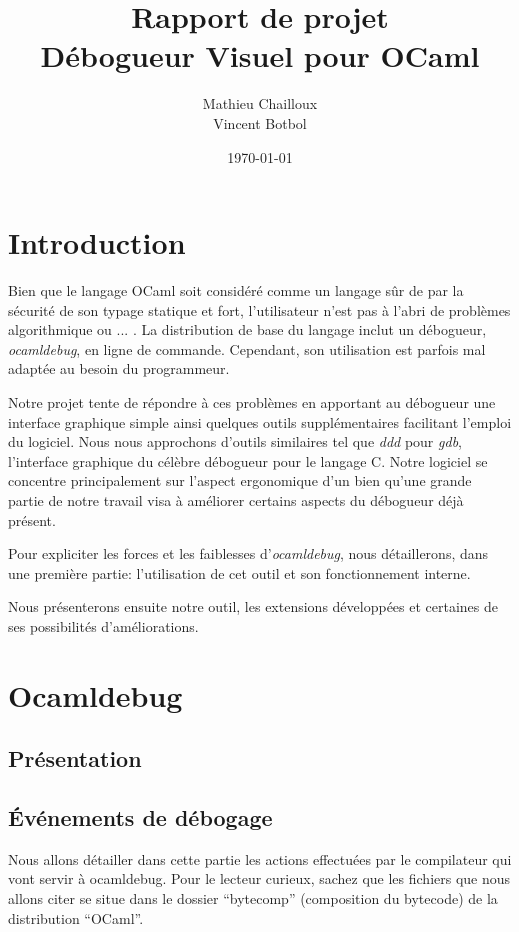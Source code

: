 \documentclass[11pt,a4paper]{report}
\title{Rapport de projet\\Débogueur Visuel pour OCaml}
\author{Mathieu Chailloux\\Vincent Botbol}
\date\today
\begin{document}
\maketitle

\chapter{Introduction}

Bien que le langage OCaml soit considéré comme un langage sûr de par la sécurité de son typage statique et fort, %
l'utilisateur n'est pas à l'abri de problèmes algorithmique ou ... . La distribution de base du langage inclut %
un débogueur, \emph{ocamldebug}, en ligne de commande. Cependant, son utilisation est parfois mal adaptée au besoin du programmeur.

Notre projet tente de répondre à ces problèmes en apportant au débogueur une interface graphique simple ainsi quelques
outils supplémentaires facilitant l'emploi du logiciel. Nous nous approchons d'outils similaires
tel que \emph{ddd} pour \emph{gdb}, l'interface graphique du célèbre débogueur pour le langage C. Notre logiciel se concentre
principalement sur l'aspect ergonomique d'un  bien qu'une grande partie de notre travail visa à améliorer certains
aspects du débogueur déjà présent.

Pour expliciter les forces et les faiblesses d'\emph{ocamldebug}, nous détaillerons, dans une première partie:
l'utilisation de cet outil et son fonctionnement interne.

Nous présenterons ensuite notre outil, les extensions développées et certaines de ses possibilités d'améliorations.

\chapter{Ocamldebug}

\section{Présentation}


\section{\'Evénements de débogage}

Nous allons détailler dans cette partie les actions effectuées par le compilateur qui vont servir à ocamldebug. Pour le lecteur curieux, sachez que les fichiers que nous allons citer se situe dans le dossier ``bytecomp'' (composition du bytecode) de la distribution ``OCaml''.
\end{document}
